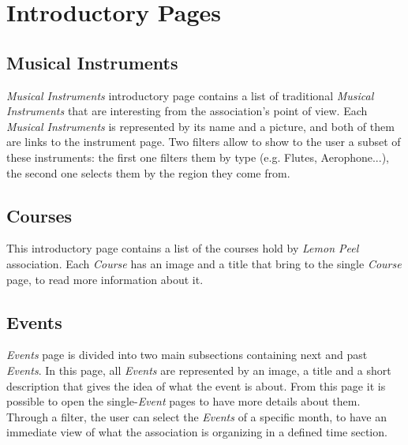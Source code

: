 \documentclass[../../DD.tex]{subfiles}
\begin{document}
\section{Introductory Pages \label{sect:2.1}}
	\subsection{Musical Instruments}
		\textit{Musical Instruments} introductory page contains a list of traditional \textit{Musical Instruments} that are interesting from the association's point of view. Each \textit{Musical Instruments} is represented by its name and a picture, and both of them are links to the instrument page. Two filters allow to show to the user a subset of these instruments: the first one filters them by type (e.g. Flutes, Aerophone...), the second one selects them by the region they come from.
		\newline

	\subsection{Courses}
		This introductory page contains a list of the courses hold by \textit{Lemon Peel} association. Each \textit{Course} has an image and a title that bring to the single \textit{Course} page, to read more information about it.
		\newline

	\subsection{Events}
		\textit{Events} page is divided into two main subsections containing next and past \textit{Events}. In this page, all \textit{Events} are represented by an image, a title and a short description that gives the idea of what the event is about. From this page it is possible to open the single-\textit{Event} pages to have more details about them. Through a filter, the user can select the \textit{Events} of a specific month, to have an immediate view of what the association is organizing in a defined time section.
		\newline

	
\end{document}
